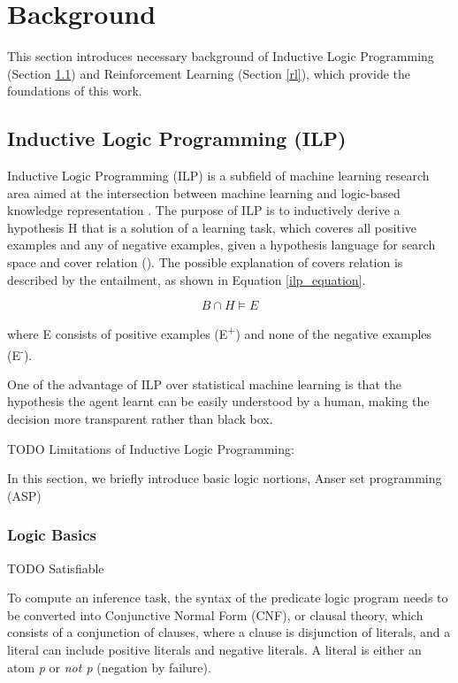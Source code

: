 \documentclass[12pt,twoside]{report}
\begin{document}
\chapter{Background}
\label{background}

This section introduces necessary background of Inductive Logic Programming (Section \ref{ilp}) and Reinforcement Learning (Section \ref{rl}), which provide the foundations of this work.

\section{Inductive Logic Programming (ILP)}
\label{ilp}

Inductive Logic Programming (ILP) is a subfield of machine learning research area aimed at the intersection between machine learning and logic-based knowledge representation \cite{Muggleton1991}. The purpose of ILP is to inductively derive a hypothesis H that is a solution of a learning task, which coveres all positive examples and any of negative examples, given a hypothesis language for search space and cover relation (\cite{DeRaedt1997}). The possible explanation of covers relation is described by the entailment, as shown in Equation \ref{ilp_equation}.

\begin{equation}
B \cap H \models E
\end{equation}
\label{ilp_equation}

where E consists of positive examples (E\textsuperscript{+}) and none of the negative examples (E\textsuperscript{-}).

One of the advantage of ILP over statistical machine learning is that the hypothesis the agent learnt can be easily understood by a human, making the decision more transparent rather than black box.


TODO Limitations of Inductive Logic Programming:

In this section, we briefly introduce basic logic nortions, Anser set programming (ASP)

\subsection{Logic Basics}

TODO Satisfiable

To compute an inference task, the syntax of the predicate logic program needs to be converted into Conjunctive Normal Form (CNF), or clausal theory, which consists of a conjunction of clauses, where a clause is disjunction of literals, and a literal can include positive literals and negative literals. A literal is either an atom \textit{p} or \textit{not p} (negation by failure).
\end{document}

